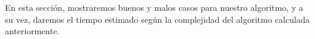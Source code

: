 \indent En esta secci\'on, mostraremos buenos y malos casos para nuestro algoritmo, y a su vez, daremos el tiempo estimado 
seg\'un la complejidad del algoritmo calculada anteriormente.

